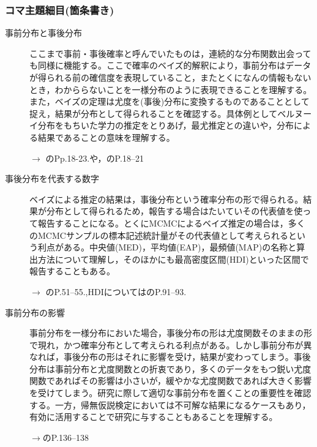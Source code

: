 \subsubsection{コマ主題細目(箇条書き)}
\begin{description}
	\item[事前分布と事後分布] ここまで事前・事後確率と呼んでいたものは，連続的な分布関数出会っても同様に機能する。ここで確率のベイズ的解釈により，事前分布はデータが得られる前の確信度を表現していること，またとくになんの情報もないとき，わかららないことを一様分布のように表現できることを理解する。また，ベイズの定理は尤度を(事後)分布に変換するものであることとして捉え，結果が分布として得られることを確認する。具体例としてベルヌーイ分布をもちいた学力の推定をとりあげ，最尤推定との違いや，分布による結果であることの意味を理解する。
	      \begin{flushright}
		      $\to$ \citet{Maeda2017}のPp.18-23.や，\citet{Toyoda201606}のP.18--21
	      \end{flushright}

	\item[事後分布を代表する数字]ベイズによる推定の結果は，事後分布という確率分布の形で得られる。結果が分布として得られるため，報告する場合はたいていその代表値を使って報告することになる。とくにMCMCによるベイズ推定の場合は，多くのMCMCサンプルの標本記述統計量がその代表値として考えられるという利点がある。中央値(MED)，平均値(EAP)，最頻値(MAP)の名称と算出方法について理解し，そのほかにも最高密度区間(HDI)といった区間で報告することもある。
	      \begin{flushright}
		      $\to$ \citet{Toyoda201506}のP.51--55.,HDIについては\citet{Maeda2017}のP.91--93.
	      \end{flushright}

	\item[事前分布の影響]事前分布を一様分布においた場合，事後分布の形は尤度関数そのままの形で現れ，かつ確率分布として考えられる利点がある。しかし事前分布が異なれば，事後分布の形はそれに影響を受け，結果が変わってしまう。事後分布は事前分布と尤度関数との折衷であり，多くのデータをもつ鋭い尤度関数であればその影響は小さいが，緩やかな尤度関数であれば大きく影響を受けてしまう。研究に際して適切な事前分布を置くことの重要性を確認する。一方，帰無仮説検定においては不可解な結果になるケースもあり，有効に活用することで研究に与することもあることを理解する。
	      \begin{flushright}
		      $\to$\citet{Maeda2017}のP.136--138
	      \end{flushright}

\end{description}
